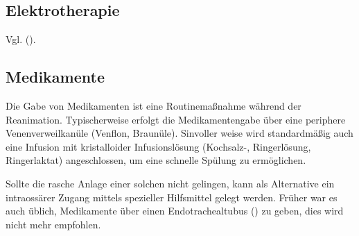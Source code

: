 \subsection{Elektrotherapie}

Vgl. \CO{[BLS]} ().


\subsection{Medikamente}
%
%
%
Die Gabe von Medikamenten ist eine Routinemaßnahme während
der Reanimation. Typischerweise erfolgt die Medikamentengabe
über eine periphere Venenverweilkanüle
(Venflon{\texttrademark}, Braunüle{\texttrademark}).
Sinvoller weise wird standardmäßig auch eine Infusion mit
kristalloider Infusionslösung (Kochsalz-,
Ringerlösung, Ringerlaktat) angeschlossen, um eine schnelle
Spülung zu ermöglichen.

Sollte
die rasche Anlage einer solchen nicht gelingen, kann als
Alternative ein intraossärer Zugang mittels spezieller
Hilfsmittel gelegt werden.
Früher war es auch üblich, Medikamente über einen
Endotrachealtubus () zu geben, dies wird nicht mehr
empfohlen.

